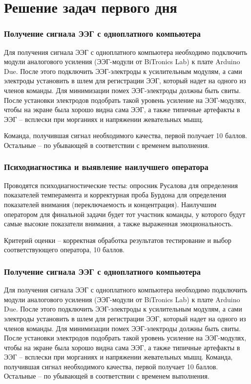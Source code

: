 \section{Решение задач первого дня}

\subsubsection*{Получение сигнала ЭЭГ с одноплатного компьютера}

Для получения сигнала ЭЭГ с одноплатного компьютера необходимо подключить модули аналогового усиления (ЭЭГ-модули от BiTronics Lab) к плате Arduino Due. После этого подключить ЭЭГ-электроды к усилительным модулям, а сами электроды установить в шлем для регистрации ЭЭГ, который надет на одного из членов команды. Для минимизации помех ЭЭГ-электроды должны быть свиты. После установки электродов подобрать такой уровень усиление на ЭЭГ-модулях, чтобы на экране была хорошо видна сама ЭЭГ, а также типичные артефакты в ЭЭГ – всплески при морганиях и напряжении жевательных мышц.

Команда, получившая сигнал необходимого качества, первой получает 10 баллов. Остальные – по убывающей в соответствии с временем выполнения.

\subsubsection*{Психодиагностика и выявление наилучшего оператора}

Проводятся психодиагностические тесты: опросник Русалова для определения показателей темперамента и корректурная проба Бурдона для определения показателей внимания (переключаемость и концентрация). Наилучшим оператором для финальной задачи будет тот участник команды, у которого будут самые высокие показатели внимания, а также выраженная эмоциональность.

Критерий оценки – корректная обработка результатов тестирование и выбор соответствующего оператора, 10 баллов.

\solutionSection

\subsubsection*{Получение сигнала ЭЭГ с одноплатного компьютера}

Для получения сигнала ЭЭГ с одноплатного компьютера необходимо подключить модули аналогового усиления (ЭЭГ-модули от BiTronics Lab) к плате Arduino Due. После этого подключить ЭЭГ-электроды к усилительным модулям, а сами электроды установить в шлем для регистрации ЭЭГ, который надет на одного из членов команды. Для минимизации помех ЭЭГ-электроды должны быть свиты. После установки электродов подобрать такой уровень усиление на ЭЭГ-модулях, чтобы на экране была хорошо видна сама ЭЭГ, а также типичные артефакты в ЭЭГ – всплески при морганиях и напряжении жевательных мышц.
Команда, получившая сигнал необходимого качества, первой получает 10 баллов. Остальные – по убывающей в соответствии с временем выполнения.

